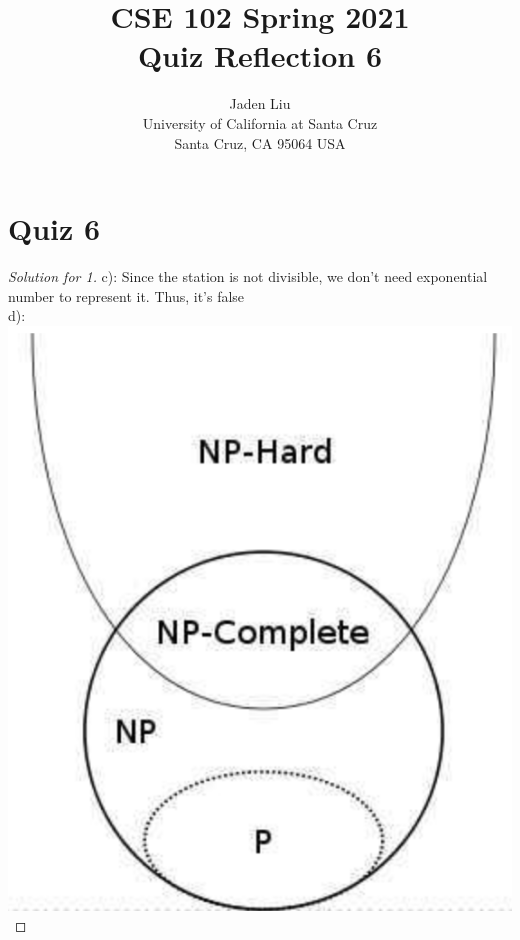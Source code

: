 \documentclass[12pt]{article}
\begin{document}
\title{ CSE 102 Spring 2021\\
	Quiz Reflection 6}

\author{Jaden Liu \\ 
University of California at Santa Cruz\\
Santa Cruz, CA 95064 USA }

\maketitle


\section{Quiz 6}
\begin{proof}[Solution for 1]
	c): Since the station is not divisible, we don't need exponential number to represent it. Thus, it's false\\
	d): \includegraphics[scale=0.25]{1.png}
\end{proof}
\end{document}
